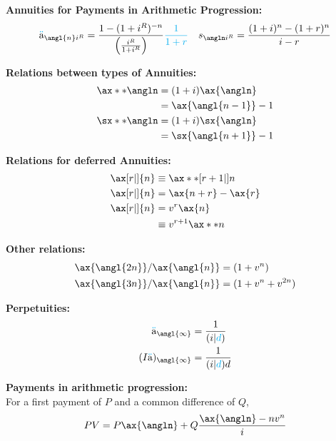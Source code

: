 \documentclass[10pt, french]{article}
\newcommand\cumlaut[2][black]{\stackon[.33ex]{#2}{\textcolor{#1}{\kern-.04ex.\kern-.2ex.}}}
\begin{document}
\begin{multicols*}{2}
\textbf{Annuities for Payments in Arithmetic Progression:}
\begin{align*}
	\cumlaut[cyan]{a}_{\angl{n}i^{R}}
		&=	\frac{1 - (1 + i^{R})^{-n}}{\left( \frac{i^{R}}{1 + i^{R}} \right)} {\color{cyan}\frac{1}{1 + r}	}	&
	{s}_{\angln i^{R}}
		&=	\frac{(1+i)^{n} - (1 + r)^{n}}{i - r} 	\\
\end{align*}

\textbf{Relations between types of Annuities:}
\begin{align*}
	\ax**{\angln}	
	&=	(1 + i) \ax{\angln}	\\
	&=	\ax{\angl{n - 1}} - 1	\\
	\sx**{\angln}	
	&=	(1 + i) \sx{\angln}	\\
	&=	\sx{\angl{n + 1}} - 1	
\end{align*}

\textbf{Relations for deferred Annuities:}
\begin{align*}
	\ax[r|]{n} 
	&\equiv \ax**[r + 1| ]{n}	\\
	\ax[r|]{n}
	&=	\ax{n + r} - \ax{r}	\\
	\ax[r|]{n}
	&=	v^{r} \ax{n}		\\
	&\equiv	v^{r + 1} \ax**{n}	\\
\end{align*}

\textbf{Other relations:}
\begin{align*}
	\ax{\angl{2n}} / \ax{\angl{n}}
	&=	(1 + v^{n})	\\
	\ax{\angl{3n}} / \ax{\angl{n}}
	&=	(1 + v^{n} + v^{2n})	\\
\end{align*}

\textbf{Perpetuities:}
\begin{align*}
	\cumlaut[cyan]{a}_{\angl{\infty}} 
		&= \frac{1}{(i|\textcolor{cyan}{d})} 	\\
	(I\cumlaut[cyan]{a})_{\angl{\infty}} 
		&= \frac{1}{(i|\textcolor{cyan}{d})d} 	\\
\end{align*}


\textbf{Payments in arithmetic progression:}\\
For a first payment of $P$ and a common difference of $Q$, 
\begin{align*}
	PV
	&=	P\ax{\angln} + Q \frac{\ax{\angln} - n v^{n}}{i}	\\
\end{align*}


\end{multicols*}
\end{document}
